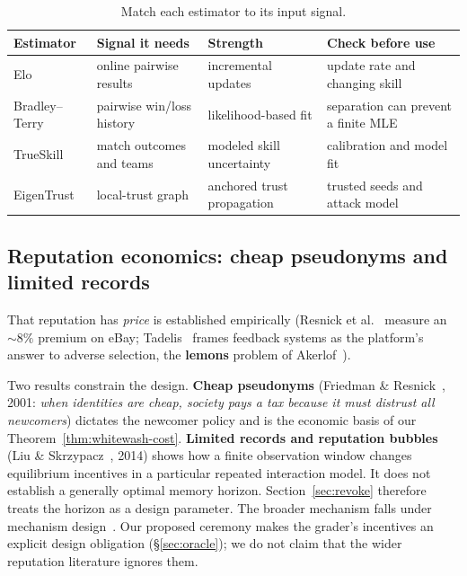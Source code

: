 \documentclass[11pt,a4paper]{article}
\theoremstyle{definition}
\begin{document}
\begin{table}[H]
\centering\small\renewcommand{\arraystretch}{1.3}
\begin{tabularx}{\textwidth}{@{}l >{\raggedright\arraybackslash}X >{\raggedright\arraybackslash}X >{\raggedright\arraybackslash}X@{}}
\toprule
\textbf{Estimator} & \textbf{Signal it needs} & \textbf{Strength} & \textbf{Check before use} \\
\midrule
Elo & online pairwise results & incremental updates & update rate and changing skill \\
Bradley--Terry & pairwise win/loss history & likelihood-based fit & separation can prevent a finite MLE \\
TrueSkill & match outcomes and teams & modeled skill uncertainty & calibration and model fit \\
EigenTrust & local-trust graph & anchored trust propagation & trusted seeds and attack model \\
\bottomrule
\end{tabularx}
\caption{Match each estimator to its input signal.}
\label{tab:estimators}
\end{table}

\subsection{Reputation economics: cheap pseudonyms and limited records}

That reputation has \emph{price} is established empirically (Resnick et
al.~ measure an ${\sim}8\%$ premium on eBay; Tadelis~
frames feedback systems as the platform's answer to adverse selection, the
\textbf{lemons} problem of Akerlof~).

Two results constrain the
design. \textbf{Cheap pseudonyms} (Friedman \& Resnick~,
2001: \emph{when identities are cheap, society pays a tax because it must
distrust all newcomers}) dictates the newcomer policy and is the economic basis
of our Theorem~\ref{thm:whitewash-cost}. \textbf{Limited records and reputation
bubbles} (Liu \& Skrzypacz~, 2014) shows how a finite
observation window changes equilibrium incentives in a particular repeated
interaction model. It does not establish a generally optimal memory horizon.
Section~\ref{sec:revoke} therefore treats the horizon as a design parameter.
The broader mechanism falls under mechanism design~.
Our proposed ceremony makes the grader's incentives an explicit design obligation
(\S\ref{sec:oracle}); we do not claim that the wider reputation literature
ignores them.
\end{document}
